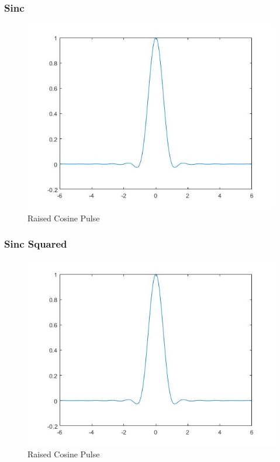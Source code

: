 \documentclass{article}
\begin{document}
\subsubsection{Sinc}
\begin{figure}[H]
  \begin{center}
    \includegraphics[width = \linewidth]{Raised_Cosine_Pulse.jpg}
    \caption{Raised Cosine Pulse}
    \label{fig:Sinc-Pulse}
  \end{center}
\end{figure}
\subsubsection{Sinc Squared}
\begin{figure}[H]
  \begin{center}
    \includegraphics[width = \linewidth]{Raised_Cosine_Pulse.jpg}
    \caption{Raised Cosine Pulse}
    \label{fig:Sinc-Squared}
  \end{center}
\end{figure}
\end{document}
